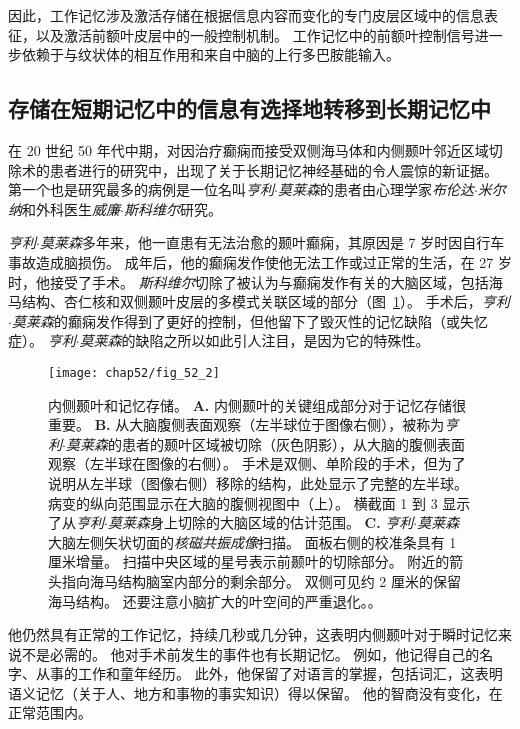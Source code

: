 因此，工作记忆涉及激活存储在根据信息内容而变化的专门皮层区域中的信息表征，以及激活前额叶皮层中的一般控制机制。
工作记忆中的前额叶控制信号进一步依赖于与纹状体的相互作用和来自中脑的上行多巴胺能输入。



\subsection{存储在短期记忆中的信息有选择地转移到长期记忆中}

在 20 世纪 50 年代中期，对因治疗癫痫而接受双侧海马体和内侧颞叶邻近区域切除术的患者进行的研究中，出现了关于长期记忆神经基础的令人震惊的新证据。
第一个也是研究最多的病例是一位名叫\textit{亨利$\cdot$莫莱森}的患者由心理学家\textit{布伦达$\cdot$米尔纳}和外科医生\textit{威廉$\cdot$斯科维尔}研究。


\textit{亨利$\cdot$莫莱森}多年来，他一直患有无法治愈的颞叶癫痫，其原因是 7 岁时因自行车事故造成脑损伤。
成年后，他的癫痫发作使他无法工作或过正常的生活，在 27 岁时，他接受了手术。
\textit{斯科维尔}切除了被认为与癫痫发作有关的大脑区域，包括海马结构、杏仁核和双侧颞叶皮层的多模式关联区域的部分（图~\ref{fig:52_2}）。
手术后，\textit{亨利$\cdot$莫莱森}的癫痫发作得到了更好的控制，但他留下了毁灭性的记忆缺陷（或失忆症）。
\textit{亨利$\cdot$莫莱森}的缺陷之所以如此引人注目，是因为它的特殊性。


\begin{figure}[htbp]
	\centering
	\texttt{[image: chap52/fig\_52\_2]}
	\caption{内侧颞叶和记忆存储。
		\textbf{A.} 内侧颞叶的关键组成部分对于记忆存储很重要。
		\textbf{B.} 从大脑腹侧表面观察（左半球位于图像右侧），被称为\textit{亨利$\cdot$莫莱森}的患者的颞叶区域被切除（灰色阴影），从大脑的腹侧表面观察（左半球在图像的右侧）。
		手术是双侧、单阶段的手术，但为了说明从左半球（图像右侧）移除的结构，此处显示了完整的左半球。
		病变的纵向范围显示在大脑的腹侧视图中（上）。
		横截面 1 到 3 显示了从\textit{亨利$\cdot$莫莱森}身上切除的大脑区域的估计范围\cite{corkin1997hm}。
		\textbf{C.} \textit{亨利$\cdot$莫莱森}大脑左侧矢状切面的\textit{核磁共振成像}扫描。
		面板右侧的校准条具有 1 厘米增量。
		扫描中央区域的星号表示前颞叶的切除部分。
		附近的箭头指向海马结构脑室内部分的剩余部分。
		双侧可见约 2 厘米的保留海马结构。
		还要注意小脑扩大的叶空间的严重退化。\cite{corkin1997hm}。}
	\label{fig:52_2}
\end{figure}


他仍然具有正常的工作记忆，持续几秒或几分钟，这表明内侧颞叶对于瞬时记忆来说不是必需的。
他对手术前发生的事件也有长期记忆。
例如，他记得自己的名字、从事的工作和童年经历。
此外，他保留了对语言的掌握，包括词汇，这表明语义记忆（关于人、地方和事物的事实知识）得以保留。
他的智商没有变化，在正常范围内。


